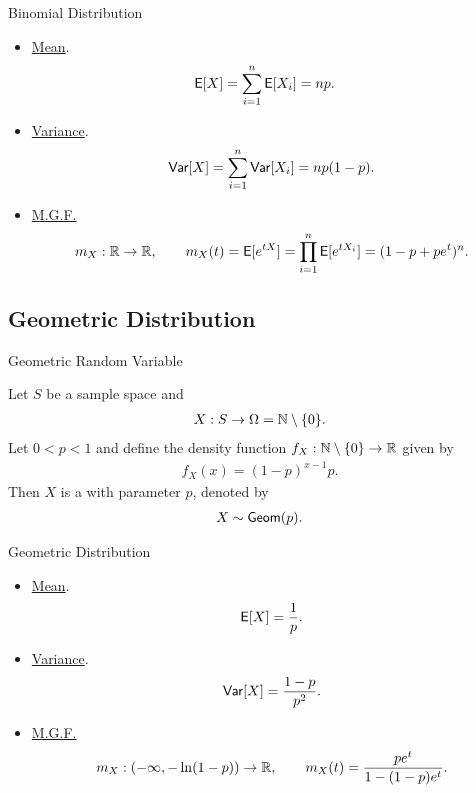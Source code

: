 \begin{frame}{Binomial Distribution}

\justifying
{} 
\begin{itemize}
	\justifying
	\item \underline{Mean}.
	\begin{align*}
	\mathsf{E}[X] & = \sum_{i=1}^n \mathsf{E}[X_i] = np.
	\end{align*}
	\item \underline{Variance}. 
	\begin{align*}
	\mathsf{Var}[X] = \sum_{i=1}^n\mathsf{Var}[X_i] = np(1-p).
	\end{align*}
	\item \underline{M.G.F.}
	\begin{align*}
	m_X: \mathbb{R}\rightarrow\mathbb{R}, \qquad m_X(t) = \mathsf{E}[e^{tX}] = \prod_{i=1}^n\mathsf{E}[e^{tX_i}] = (1 - p + pe^t)^n.
	\end{align*}
\end{itemize}

\end{frame}

\subsection{Geometric Distribution}

\begin{frame}{Geometric Random Variable}

\justifying
{} Let $S$ be a sample space and
\begin{align*}
X: S\rightarrow \Omega = \mathbb{N}\setminus \{0\}.
\end{align*}
Let $0 < p < 1$ and define the density function $f_X: \mathbb{N}\setminus \{0\} \rightarrow \mathbb{R}$ given by
\begin{align*}
f_X(x) = (1-p)^{x-1} p.
\end{align*}
Then $X$ is a  with parameter $p$, denoted by
\begin{align*}
X\sim \mathsf{Geom}(p).
\end{align*}

\end{frame}

\begin{frame}{Geometric Distribution}

\justifying
{} 
\begin{itemize}
	\justifying
	\item \underline{Mean}.
	\begin{align*}
	\mathsf{E}[X] = \frac{1}{p}.
	\end{align*}
	\item \underline{Variance}.
	\begin{align*}
	\mathsf{Var}[X] = \frac{1-p}{p^2}.
	\end{align*}
	\item \underline{M.G.F.}
	\begin{align*}
	m_X: (-\infty, -\ln(1-p)) \rightarrow\mathbb{R}, \qquad m_X(t) = \frac{pe^t}{1-(1-p)e^t}.
	\end{align*}
\end{itemize}

\end{frame}


